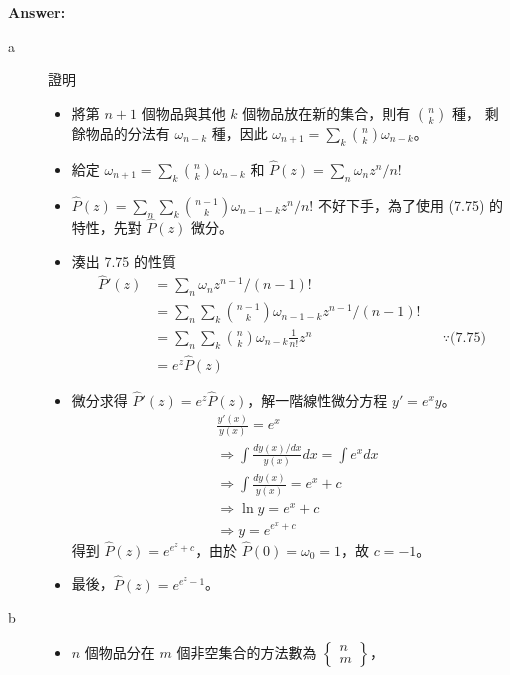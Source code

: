 \documentclass[11pt,fleqn]{article}
\renewcommand\part[1]{\vspace{.10in}\textbf{#1}}
\begin{document}
\part{Answer:}

\begin{description}
	\item[a] 證明
		\begin{itemize}
			\item 將第 $n+1$ 個物品與其他 $k$ 個物品放在新的集合，則有 $\binom{n}{k}$ 種，
				剩餘物品的分法有 $\omega_{n-k}$ 種，因此 $\omega_{n+1} = \sum_k \binom{n}{k} \omega_{n-k}$。
			\item 給定 $\omega_{n+1} = \sum_k \binom{n}{k} \omega_{n-k}$ 和
					$\widehat{P}(z) = \sum_n \omega_n z^n / n!$
			\item $\widehat{P}(z) = \sum_n \sum_k \binom{n-1}{k} \omega_{n-1-k} z^n / n!$ 
				不好下手，為了使用 (7.75) 的特性，先對 $\widehat{P}(z)$ 微分。
			\item 湊出 7.75 的性質
				\begin{align*}
					\widehat{P}'(z) 
					&= \sum_n \omega_{n} z^{n-1}/(n-1)! \\
					&= \sum_n \sum_k \binom{n-1}{k} \omega_{n-1-k} z^{n-1}/(n-1)! \\
					&= \sum_n \sum_k \binom{n}{k} \omega_{n-k} \frac{1}{n!} z^{n} 
						&& \because \text{(7.75)} \\
					&= e^z \widehat{P}(z)
				\end{align*}
			\item
				微分求得 $\widehat{P}'(z) = e^z \widehat{P}(z)$，解一階線性微分方程 $y' = e^x y$。
				\begin{align*}
					& \frac{y'(x)}{y(x)} = e^x \\
					& \Rightarrow \int \frac{d y(x) / dx}{y(x)} dx = \int e^x dx \\
					& \Rightarrow \int \frac{d y(x)}{y(x)} = e^x + c \\
					& \Rightarrow \ln y = e^x + c\\
					& \Rightarrow y = e^{e^x + c}
				\end{align*}
				得到 $\widehat{P}(z) = e^{e^z+c}$，由於 $\widehat{P}(0)=\omega_0=1$，故 $c=-1$。
			\item 最後，$\widehat{P}(z) = e^{e^z-1}$。
		\end{itemize}
	\item[b]
		\begin{itemize}
			\item $n$ 個物品分在 $m$ 個非空集合的方法數為 $\begin{Bmatrix}n\\m\end{Bmatrix}$，

\end{itemize}
\end{description}
\end{document}
